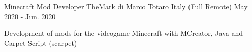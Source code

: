 \begin{cventries}
  \cventry
    {Minecraft Mod Developer} %
    {TheMark di Marco Totaro} %
    {Italy (Full Remote)} %
    {May 2020 - Jun. 2020} %
    {
      \begin{cvitems} %
        \item {Development of mods for the videogame Minecraft with MCreator, Java and Carpet Script (scarpet)}
      \end{cvitems}
    }
\end{cventries}